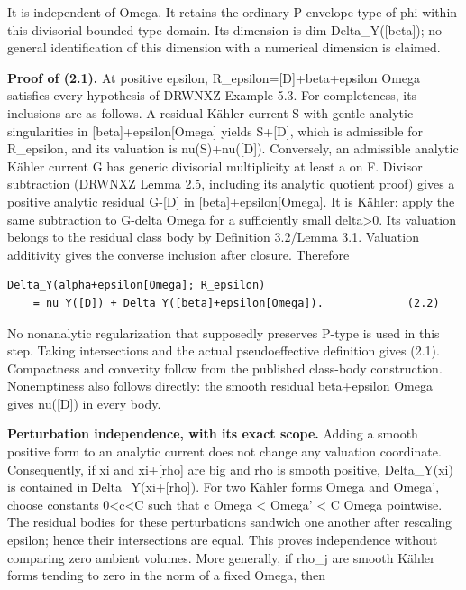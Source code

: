 \documentclass[11pt]{article}
\begin{document}
It is independent of Omega. It retains the ordinary P-\allowbreak{}envelope type of phi within this divisorial bounded-\allowbreak{}type domain. Its dimension is dim Delta\_\allowbreak{}Y([beta]); no general identification of this dimension with a numerical dimension is claimed.

\textbf{Proof of (2.1).} At positive epsilon, R\_\allowbreak{}epsilon=\allowbreak{}[D]+beta+epsilon Omega satisfies every hypothesis of DRWNXZ Example 5.3. For completeness, its inclusions are as follows. A residual Kähler current S with gentle analytic singularities in [beta]+epsilon[Omega] yields S+[D], which is admissible for R\_\allowbreak{}epsilon, and its valuation is nu(S)+nu([D]). Conversely, an admissible analytic Kähler current G has generic divisorial multiplicity at least a on F. Divisor subtraction (DRWNXZ Lemma 2.5, including its analytic quotient proof) gives a positive analytic residual G-\allowbreak{}[D] in [beta]+epsilon[Omega]. It is Kähler: apply the same subtraction to G-\allowbreak{}delta Omega for a sufficiently small delta>0. Its valuation belongs to the residual class body by Definition 3.2/\allowbreak{}Lemma 3.1. Valuation additivity gives the converse inclusion after closure. Therefore

\begin{Verbatim}[breaklines=true,fontsize=\small]
Delta_Y(alpha+epsilon[Omega]; R_epsilon)
    = nu_Y([D]) + Delta_Y([beta]+epsilon[Omega]).             (2.2)
\end{Verbatim}

No nonanalytic regularization that supposedly preserves P-\allowbreak{}type is used in this step. Taking intersections and the actual pseudoeffective definition gives (2.1). Compactness and convexity follow from the published class-\allowbreak{}body construction. Nonemptiness also follows directly: the smooth residual beta+epsilon Omega gives nu([D]) in every body.

\textbf{Perturbation independence, with its exact scope.} Adding a smooth positive form to an analytic current does not change any valuation coordinate. Consequently, if xi and xi+[rho] are big and rho is smooth positive, Delta\_\allowbreak{}Y(xi) is contained in Delta\_\allowbreak{}Y(xi+[rho]). For two Kähler forms Omega and Omega', choose constants 0<c<C such that c Omega < Omega' < C Omega pointwise. The residual bodies for these perturbations sandwich one another after rescaling epsilon; hence their intersections are equal. This proves independence without comparing zero ambient volumes. More generally, if rho\_\allowbreak{}j are smooth Kähler forms tending to zero in the norm of a fixed Omega, then
\end{document}
